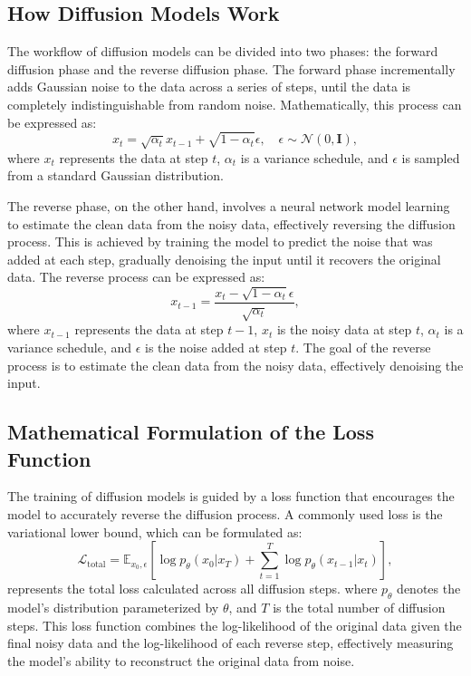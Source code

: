 \documentclass{article}
\begin{document}
		\subsection{How Diffusion Models Work}
			The workflow of diffusion models can be divided into two phases: the forward diffusion phase and the reverse diffusion phase. The forward phase incrementally adds Gaussian noise to the data across a series of steps, until the data is completely indistinguishable from random noise. Mathematically, this process can be expressed as:
			\begin{equation}
			x_{t} = \sqrt{\alpha_t} x_{t-1} + \sqrt{1 - \alpha_t} \epsilon, \quad \epsilon \sim \mathcal{N}(0, \mathbf{I}),
			\end{equation}
			where $x_t$ represents the data at step $t$, $\alpha_t$ is a variance schedule, and $\epsilon$ is sampled from a standard Gaussian distribution.

			The reverse phase, on the other hand, involves a neural network model learning to estimate the clean data from the noisy data, effectively reversing the diffusion process. This is achieved by training the model to predict the noise that was added at each step, gradually denoising the input until it recovers the original data. The reverse process can be expressed as:
			\begin{equation}
			x_{t-1} = \frac{x_t - \sqrt{1 - \alpha_t} \epsilon}{\sqrt{\alpha_t}},
			\end{equation}
			where $x_{t-1}$ represents the data at step $t-1$, $x_t$ is the noisy data at step $t$, $\alpha_t$ is a variance schedule, and $\epsilon$ is the noise added at step $t$. The goal of the reverse process is to estimate the clean data from the noisy data, effectively denoising the input.

		\subsection{Mathematical Formulation of the Loss Function}
			The training of diffusion models is guided by a loss function that encourages the model to accurately reverse the diffusion process. A commonly used loss is the variational lower bound, which can be formulated as:
			\begin{equation}
				\mathcal{L}_{\text{{total}}} = \mathbb{E}_{x_0,\epsilon}\left[\log p_\theta(x_0|x_T) + \sum_{t=1}^{T}\log p_\theta(x_{t-1}|x_t)\right],
			\end{equation} 
			represents the total loss calculated across all diffusion steps.
			where $p_\theta$ denotes the model's distribution parameterized by $\theta$, and $T$ is the total number of diffusion steps. This loss function combines the log-likelihood of the original data given the final noisy data and the log-likelihood of each reverse step, effectively measuring the model's ability to reconstruct the original data from noise.
\end{document}
